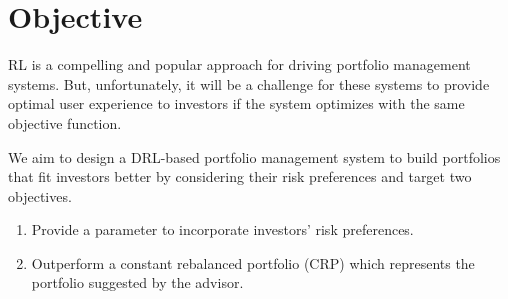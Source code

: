 \section{Objective}
RL is a compelling and popular approach for driving portfolio management systems. But, unfortunately, it will be a challenge for these systems to provide optimal user experience to investors if the system optimizes with the same objective function.

We aim to design a DRL-based portfolio management system to build portfolios that fit investors better by considering their risk preferences and target two objectives.
\begin{enumerate}
    \item  Provide a parameter to incorporate investors' risk preferences.
    \item Outperform a constant rebalanced portfolio (CRP) which represents the portfolio suggested by the advisor. 
\end{enumerate}

